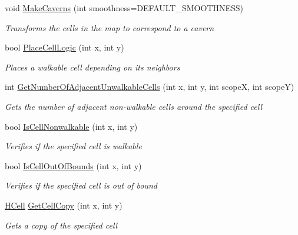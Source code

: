 \begin{DoxyCompactItemize}
void \hyperlink{class_hel_project_1_1_game_world_1_1_map_1_1_h_map_a338b82cacb27f45c792f090e6bfc12fe}{Make\+Caverns} (int smoothness=D\+E\+F\+A\+U\+L\+T\+\_\+\+S\+M\+O\+O\+T\+H\+N\+E\+S\+S)
\begin{DoxyCompactList}\small\item\em Transforms the cells in the map to correspond to a cavern \end{DoxyCompactList}\item 
bool \hyperlink{class_hel_project_1_1_game_world_1_1_map_1_1_h_map_a31940bf039491720aed68ac056868f2a}{Place\+Cell\+Logic} (int x, int y)
\begin{DoxyCompactList}\small\item\em Places a walkable cell depending on it\textquotesingle{}s neighbors \end{DoxyCompactList}\item 
int \hyperlink{class_hel_project_1_1_game_world_1_1_map_1_1_h_map_ac11321d7ff766f5ff1a57bfc941d721e}{Get\+Number\+Of\+Adjacent\+Unwalkable\+Cells} (int x, int y, int scope\+X, int scope\+Y)
\begin{DoxyCompactList}\small\item\em Gets the number of adjacent non-\/walkable cells around the specified cell \end{DoxyCompactList}\item 
bool \hyperlink{class_hel_project_1_1_game_world_1_1_map_1_1_h_map_a5bca0c19006ab0058c11ebe44c888df5}{Is\+Cell\+Nonwalkable} (int x, int y)
\begin{DoxyCompactList}\small\item\em Verifies if the specified cell is walkable \end{DoxyCompactList}\item 
bool \hyperlink{class_hel_project_1_1_game_world_1_1_map_1_1_h_map_a1e2dbc41db3641f79cfcd8b319e5378d}{Is\+Cell\+Out\+Of\+Bounds} (int x, int y)
\begin{DoxyCompactList}\small\item\em Verifies if the specified cell is out of bound \end{DoxyCompactList}\item 
\hyperlink{class_hel_project_1_1_game_world_1_1_map_1_1_h_cell}{H\+Cell} \hyperlink{class_hel_project_1_1_game_world_1_1_map_1_1_h_map_abe9c8579ffe3a57f460254405202e417}{Get\+Cell\+Copy} (int x, int y)
\begin{DoxyCompactList}\small\item\em Gets a copy of the specified cell \end{DoxyCompactList}\item 

\end{DoxyCompactItemize}
